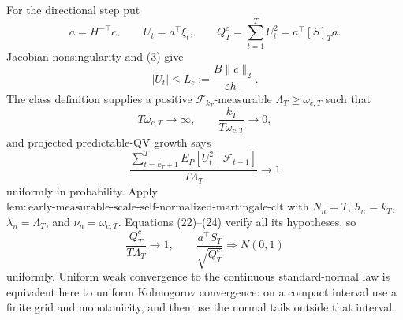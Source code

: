 For the directional step put
\[
 a=H^{-\top}c,\qquad U_t=a^\top\xi_t,\qquad
 Q_T^c=\sum_{t=1}^TU_t^2=a^\top[S]_Ta.
\tag{21}
\]
Jacobian nonsingularity and (3) give
\[
 |U_t|\le L_c:=\frac{B\|c\|_2}{\varepsilon h_-}.
\tag{22}
\]
The class definition supplies a positive \(\mathcal F_{k_T}\)-measurable \(\Lambda_T\ge\omega_{c,T}\) such that
\[
 T\omega_{c,T}\longrightarrow\infty,
 \qquad \frac{k_T}{T\omega_{c,T}}\longrightarrow0,
\tag{23}
\]
and projected predictable-QV growth says
\[
 \frac{\sum_{t=k_T+1}^TE_P[U_t^2\mid\mathcal F_{t-1}]}
 {T\Lambda_T}\longrightarrow1
\tag{24}
\]
uniformly in probability.  Apply \(\mathrm{lem:early\text{-}measurable\text{-}scale\text{-}self\text{-}normalized\text{-}martingale\text{-}clt}\) with \(N_n=T\), \(h_n=k_T\), \(\lambda_n=\Lambda_T\), and \(\nu_n=\omega_{c,T}\).  Equations (22)--(24) verify all its hypotheses, so
\[
 \frac{Q_T^c}{T\Lambda_T}\longrightarrow1,
 \qquad \frac{a^\top S_T}{\sqrt{Q_T^c}}\Rightarrow N(0,1)
\tag{25}
\]
uniformly.  Uniform weak convergence to the continuous standard-normal law is equivalent here to uniform Kolmogorov convergence: on a compact interval use a finite grid and monotonicity, and then use the normal tails outside that interval.

